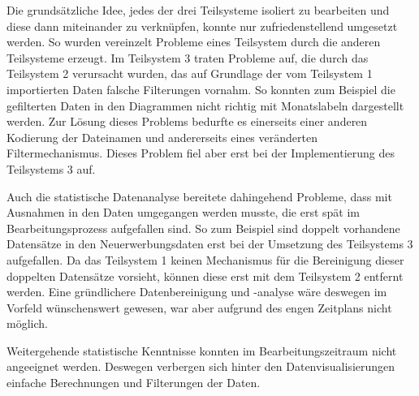 Die grundsätzliche Idee, jedes der drei Teilsysteme isoliert zu bearbeiten und diese dann miteinander zu verknüpfen, 
konnte nur zufriedenstellend umgesetzt werden. So wurden vereinzelt Probleme eines Teilsystem durch die anderen Teilsysteme erzeugt. 
Im Teilsystem 3 traten Probleme auf, die durch das Teilsystem 2 verursacht wurden, das auf Grundlage der 
vom Teilsystem 1 importierten Daten falsche Filterungen vornahm. So konnten zum Beispiel die gefilterten Daten 
in den Diagrammen nicht richtig mit Monatslabeln dargestellt werden. Zur Lösung dieses Problems bedurfte es einerseits einer 
anderen Kodierung der Dateinamen und andererseits eines veränderten Filtermechanismus. Dieses Problem fiel aber erst bei der 
Implementierung des Teilsystems 3 auf. 

Auch die statistische Datenanalyse bereitete dahingehend Probleme, dass mit Ausnahmen in den Daten umgegangen werden musste, die erst spät im Bearbeitungsprozess aufgefallen sind. 
So zum Beispiel sind doppelt vorhandene Datensätze in den Neuerwerbungsdaten erst bei der Umsetzung des Teilsystems 3
aufgefallen. Da das Teilsystem 1 keinen Mechanismus für die Bereinigung dieser doppelten Datensätze vorsieht, können diese erst mit dem Teilsystem 2 entfernt werden.
Eine gründlichere Datenbereinigung und -analyse wäre deswegen im Vorfeld wünschenswert gewesen, war aber aufgrund des engen Zeitplans nicht möglich.





Weitergehende statistische Kenntnisse konnten im Bearbeitungszeitraum nicht angeeignet werden. Deswegen verbergen sich hinter den Datenvisualisierungen einfache Berechnungen und Filterungen der Daten.

